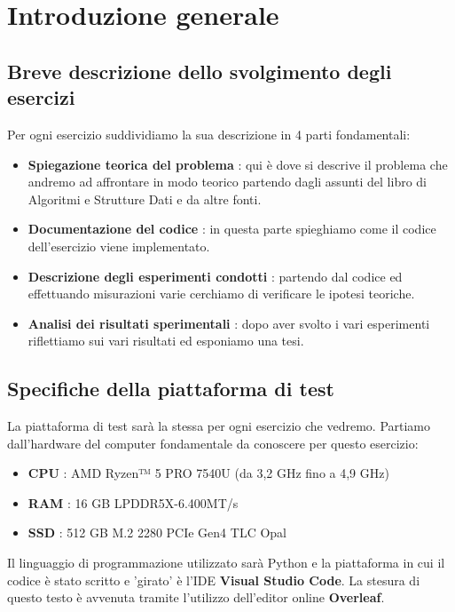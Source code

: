 \documentclass{article}
\begin{document}
\newpage
\renewcommand{\contentsname}{Indice}
\tableofcontents
{}
\newpage
\section{Introduzione generale}
\subsection{Breve descrizione dello svolgimento degli esercizi}
Per ogni esercizio suddividiamo la sua descrizione in 4 parti fondamentali:

\begin{itemize}
    \item \textbf{Spiegazione teorica del problema} : qui è dove si descrive il problema che andremo ad affrontare in modo teorico partendo dagli assunti del libro di Algoritmi e Strutture Dati e da altre fonti.
    \item \textbf{Documentazione del codice} : in questa parte spieghiamo come il codice dell'esercizio viene implementato.
    \item \textbf{Descrizione degli esperimenti condotti} : partendo dal codice ed effettuando misurazioni varie cerchiamo di verificare le ipotesi teoriche.
    \item \textbf{Analisi dei risultati sperimentali} : dopo aver svolto i vari esperimenti riflettiamo sui vari risultati ed esponiamo una tesi.
\end{itemize}

\subsection{Specifiche della piattaforma di test}
La piattaforma di test sarà la stessa per ogni esercizio che vedremo. Partiamo dall'hardware del computer fondamentale da conoscere per questo esercizio:

\begin{itemize}
    \item \textbf{CPU} : AMD Ryzen™ 5 PRO 7540U (da 3,2 GHz fino a 4,9 GHz)
    \item \textbf{RAM} : 16 GB LPDDR5X-6.400MT/s
    \item \textbf{SSD} : 512 GB M.2 2280 PCIe Gen4 TLC Opal
\end{itemize}

Il linguaggio di programmazione utilizzato sarà Python e la piattaforma in cui il codice è stato scritto e 'girato' è l'IDE \textbf{Visual Studio Code}. La stesura di questo testo è avvenuta tramite l'utilizzo dell'editor online \textbf{Overleaf}.
\end{document}
